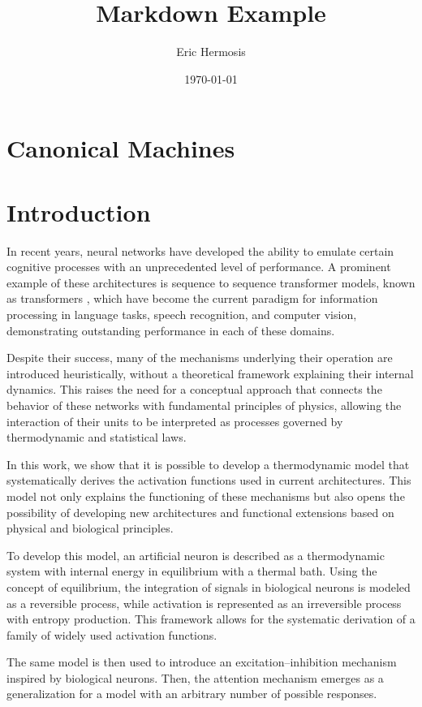 \documentclass[12pt]{article}
\title{Markdown Example}
\author{Eric Hermosis}
\date{\today}
\begin{document}
\maketitle
\section*{Canonical Machines}
\section*{Introduction}

In recent years, neural networks have developed the ability to emulate certain cognitive processes with an unprecedented level of performance. A prominent example of these architectures is sequence to sequence transformer models, known as transformers \cite{vaswani2017attention}, which have become the current paradigm for information processing in language tasks, speech recognition, and computer vision, demonstrating outstanding performance in each of these domains.

Despite their success, many of the mechanisms underlying their operation are introduced heuristically, without a theoretical framework explaining their internal dynamics. This raises the need for a conceptual approach that connects the behavior of these networks with fundamental principles of physics, allowing the interaction of their units to be interpreted as processes governed by thermodynamic and statistical laws.

In this work, we show that it is possible to develop a thermodynamic model that systematically derives the activation functions used in current architectures. This model not only explains the functioning of these mechanisms but also opens the possibility of developing new architectures and functional extensions based on physical and biological principles.

To develop this model, an artificial neuron is described as a thermodynamic system with internal energy in equilibrium with a thermal bath. Using the concept of equilibrium, the integration of signals in biological neurons \cite{dayan2001theoretical}  is modeled as a reversible process, while activation is represented as an irreversible  process with entropy production. This framework allows for the systematic derivation of a family of widely used activation functions.
 
The same model is then used to introduce an excitation–inhibition mechanism inspired by biological neurons. Then, the attention mechanism emerges as a generalization for a model with an arbitrary number of possible responses.
\end{document}
